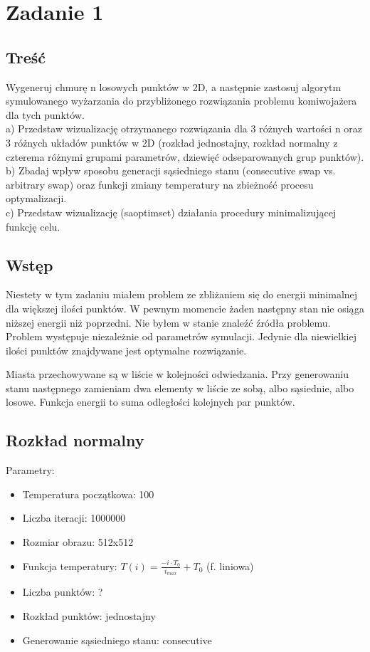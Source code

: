 \section{Zadanie 1}
\subsection{Treść}
Wygeneruj chmurę n losowych punktów w 2D, a następnie zastosuj algorytm symulowanego
wyżarzania do przybliżonego rozwiązania problemu komiwojażera dla tych punktów.\\
a) Przedstaw wizualizację otrzymanego rozwiązania dla 3 różnych wartości n oraz 3
różnych układów punktów w 2D (rozkład jednostajny, rozkład normalny z czterema
różnymi grupami parametrów, dziewięć odseparowanych grup punktów).\\
b) Zbadaj wpływ sposobu generacji sąsiedniego stanu (consecutive swap vs. arbitrary
swap) oraz funkcji zmiany temperatury na zbieżność procesu optymalizacji.\\
c) Przedstaw wizualizację (saoptimset) działania procedury minimalizującej funkcję
celu.
\subsection{Wstęp}
Niestety w tym zadaniu miałem problem ze zbliżaniem się do energii minimalnej dla większej ilości punktów. W pewnym momencie żaden następny stan nie osiąga niższej energii niż poprzedni. Nie byłem w stanie znaleźć źródła problemu. Problem występuje niezależnie od parametrów symulacji. Jedynie dla niewielkiej ilości punktów znajdywane jest optymalne rozwiązanie.

Miasta przechowywane są w liście w kolejności odwiedzania. Przy generowaniu stanu następnego zamieniam dwa elementy w liście ze sobą, albo sąsiednie, albo losowe. Funkcja energii to suma odległości kolejnych par punktów.
\subsection{Rozkład normalny}
Parametry:
\begin{itemize}
    \item Temperatura początkowa: 100
    \item Liczba iteracji: 1000000
    \item Rozmiar obrazu: 512x512
    \item Funkcja temperatury: $T(i) = \frac{-i\cdot T_0}{i_{max}} + T_0$ (f. liniowa)
    \item Liczba punktów: ?
    \item Rozkład punktów: jednostajny
    \item Generowanie sąsiedniego stanu: consecutive
\end{itemize}


